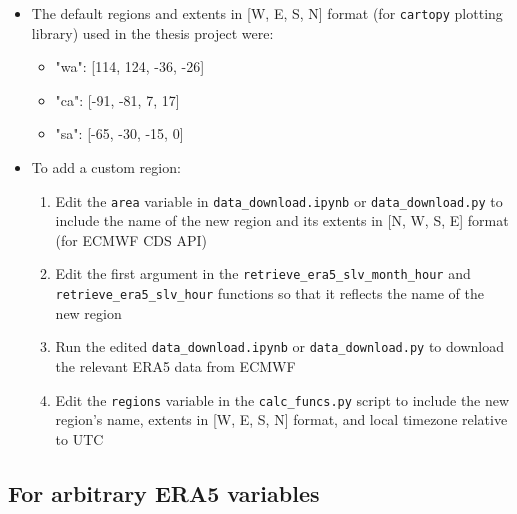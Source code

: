 \begin{itemize}
	\item The default regions and extents in [W, E, S, N] format (for \verb+cartopy+ plotting library) used in the thesis project were: 
	\begin{itemize}
		\item "wa": [114, 124, -36, -26]
		\item "ca": [-91, -81, 7, 17]
		\item "sa": [-65, -30, -15, 0]
	\end{itemize}
	\item To add a custom region:
	\begin{enumerate}
		\item Edit the \verb+area+ variable in \verb+data_download.ipynb+ or \verb+data_download.py+ to include the name of the new region and its extents in [N, W, S, E] format (for ECMWF CDS API)
		\item Edit the first argument in the \verb+retrieve_era5_slv_month_hour+ and \\ \verb+retrieve_era5_slv_hour+ functions so that it reflects the name of the new region
		\item Run the edited \verb+data_download.ipynb+ or \verb+data_download.py+ to download the relevant ERA5 data from ECMWF
		\item Edit the \verb+regions+ variable in the \verb+calc_funcs.py+ script to include the new region's name, extents in [W, E, S, N] format, and local timezone relative to UTC
	\end{enumerate}
\end{itemize}

\subsection{For arbitrary ERA5 variables}

